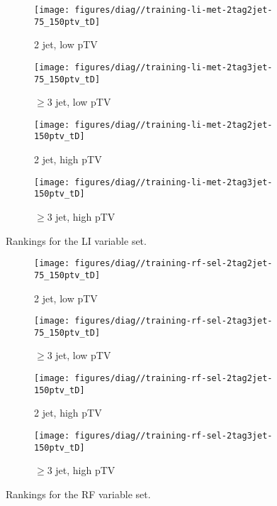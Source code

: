 \begin{figure}[!htbp]\captionsetup{justification=centering}
  \centering
\begin{subfigure}[t]{0.49\textwidth}\centering\texttt{[image: figures/diag//training-li-met-2tag2jet-75\_150ptv\_tD]}\caption{2 jet, low pTV}\end{subfigure}
\begin{subfigure}[t]{0.49\textwidth}\centering\texttt{[image: figures/diag//training-li-met-2tag3jet-75\_150ptv\_tD]}\caption{$\ge3$ jet, low pTV}\end{subfigure}
\begin{subfigure}[t]{0.49\textwidth}\centering\texttt{[image: figures/diag//training-li-met-2tag2jet-150ptv\_tD]}\caption{2 jet, high pTV}\end{subfigure}
\begin{subfigure}[t]{0.49\textwidth}\centering\texttt{[image: figures/diag//training-li-met-2tag3jet-150ptv\_tD]}\caption{$\ge3$ jet, high pTV}\end{subfigure}
  \caption{Rankings for the LI variable set.}
  \label{fig:li-met-Ranking}
\end{figure}

\begin{figure}[!htbp]\captionsetup{justification=centering}
  \centering
\begin{subfigure}[t]{0.49\textwidth}\centering\texttt{[image: figures/diag//training-rf-sel-2tag2jet-75\_150ptv\_tD]}\caption{2 jet, low pTV}\end{subfigure}
\begin{subfigure}[t]{0.49\textwidth}\centering\texttt{[image: figures/diag//training-rf-sel-2tag3jet-75\_150ptv\_tD]}\caption{$\ge3$ jet, low pTV}\end{subfigure}
\begin{subfigure}[t]{0.49\textwidth}\centering\texttt{[image: figures/diag//training-rf-sel-2tag2jet-150ptv\_tD]}\caption{2 jet, high pTV}\end{subfigure}
\begin{subfigure}[t]{0.49\textwidth}\centering\texttt{[image: figures/diag//training-rf-sel-2tag3jet-150ptv\_tD]}\caption{$\ge3$ jet, high pTV}\end{subfigure}
  \caption{Rankings for the RF variable set.}
  \label{fig:rf-sel-Ranking}
\end{figure}

